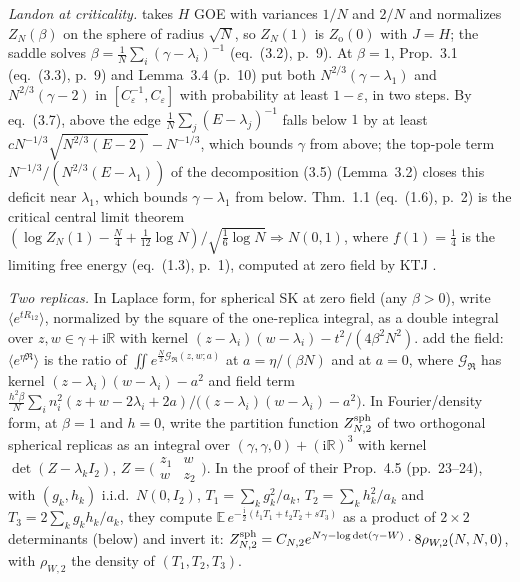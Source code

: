 \documentclass[11pt]{article}
\newcommand{\R}{\mathbb{R}}
\newcommand{\E}{\mathbb{E}}
\newcommand{\sloc}[2]{\cite[#2]{#1}}
\begin{document}
\emph{Landon at criticality.}
\sloc{Landon2020-CriticalSphericalSKFreeEnergy}{eqs.~(2.3)--(2.5), pp.~4--5}
takes $H$ GOE with variances $1/N$ and $2/N$ and normalizes $Z_N(\beta)$ on
the sphere of radius $\sqrt N$, so $Z_N(1)$ is $Z_{\mathrm o}(0)$ with
$J=H$; the saddle solves $\beta=\frac1N\sum_i(\gamma-\lambda_i)^{-1}$
(eq.~(3.2), p.~9). At $\beta=1$, Prop.~3.1 (eq.~(3.3), p.~9) and Lemma~3.4
(p.~10) put both $N^{2/3}(\gamma-\lambda_1)$ and $N^{2/3}(\gamma-2)$ in
$[C_\varepsilon^{-1},C_\varepsilon]$ with probability at least
$1-\varepsilon$, in two steps. By eq.~(3.7), above the edge
$\frac1N\sum_j(E-\lambda_j)^{-1}$ falls below $1$ by at least
$cN^{-1/3}\sqrt{N^{2/3}(E-2)}-N^{-1/3}$, which bounds $\gamma$ from above;
the top-pole term $N^{-1/3}/(N^{2/3}(E-\lambda_1))$ of the decomposition
(3.5) (Lemma~3.2) closes this deficit near $\lambda_1$, which bounds
$\gamma-\lambda_1$ from below. Thm.~1.1 (eq.~(1.6),
p.~2) is the critical central limit theorem
$(\log Z_N(1)-\frac N4+\frac1{12}\log N)/\sqrt{\frac16\log N}\Rightarrow N(0,1)$,
where $f(1)=\frac14$ is the limiting free energy (eq.~(1.3), p.~1), computed
at zero field by KTJ
\sloc{BaikEtAl2020-SphericalSpinGlassExternalField}{p.~4}.

\emph{Two replicas.} In Laplace form, for spherical SK at zero field (any
$\beta>0$),
\sloc{NguyenSosoe2018-OverlapCLTNearCriticalSphericalSK}{Lemma~4, eqs.~(3.2)--(3.4), p.~6}
write $\langle e^{tR_{12}}\rangle$, normalized by the square of the
one-replica integral,
as a double integral over $z,w\in\gamma+\mathrm i\R$ with kernel
$(z-\lambda_i)(w-\lambda_i)-t^2/(4\beta^2N^2)$.
\sloc{BaikEtAl2020-SphericalSpinGlassExternalField}{Lemma~3.3, eqs.~(3.5)--(3.6), p.~12; App.~A, pp.~70--71}
add the field: $\langle e^{\eta\mathfrak R}\rangle$ is the ratio of
$\iint e^{\frac N2\mathcal G_{\mathfrak R}(z,w;a)}$ at $a=\eta/(\beta N)$
and at $a=0$, where $\mathcal G_{\mathfrak R}$ has kernel
$(z-\lambda_i)(w-\lambda_i)-a^2$ and field term
$\frac{h^2\beta}N\sum_in_i^2(z+w-2\lambda_i+2a)/\bigl((z-\lambda_i)(w-\lambda_i)-a^2\bigr)$.
In Fourier/density form, at $\beta=1$ and $h=0$,
\sloc{DuHuang2026-CriticalSKFreeEnergyFluctuations}{Lemma~4.3, p.~19}
write the partition function $Z^{\rm sph}_{N,2}$ of two orthogonal
spherical replicas as an integral over $(\gamma,\gamma,0)+(\mathrm i\R)^3$
with kernel
$\det(Z-\lambda_kI_2)$, $Z=\bigl(\begin{smallmatrix}z_1&w\\w&z_2\end{smallmatrix}\bigr)$.
In the proof of their Prop.~4.5 (pp.~23--24), with $(g_k,h_k)$ i.i.d.\
$N(0,I_2)$, $T_1=\sum_kg_k^2/a_k$, $T_2=\sum_kh_k^2/a_k$ and
$T_3=2\sum_kg_kh_k/a_k$, they compute
$\E\,e^{-\frac{\mathrm i}2(t_1T_1+t_2T_2+sT_3)}$ as a product of $2\times2$
determinants (below) and invert it:
$Z^{\rm sph}_{N,2}=C_{N,2}e^{N\gamma-\log\det(\gamma-W)}\cdot8\rho_{W,2}(N,N,0)$,
with $\rho_{W,2}$ the density of $(T_1,T_2,T_3)$.
\end{document}
